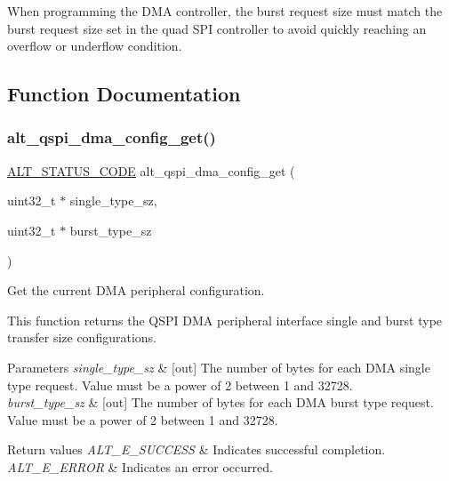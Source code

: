 When programming the D\+MA controller, the burst request size must match the burst request size set in the quad S\+PI controller to avoid quickly reaching an overflow or underflow condition. 

\subsection{Function Documentation}
\mbox{\label{group__ALT__QSPI__DMA_ga92ee264b9fe98d0acfabe3c0ac2d9d1b}} 
\subsubsection{\texorpdfstring{alt\_qspi\_dma\_config\_get()}{alt\_qspi\_dma\_config\_get()}}
{\footnotesize\ttfamily \mbox{\hyperlink{hwlib_8h_abdb0d369f069723ca55d6c94bcaaaa12}{A\+L\+T\+\_\+\+S\+T\+A\+T\+U\+S\+\_\+\+C\+O\+DE}} alt\+\_\+qspi\+\_\+dma\+\_\+config\+\_\+get (\begin{DoxyParamCaption}\item[{uint32\+\_\+t $\ast$}]{single\+\_\+type\+\_\+sz,  }\item[{uint32\+\_\+t $\ast$}]{burst\+\_\+type\+\_\+sz }\end{DoxyParamCaption})}

Get the current D\+MA peripheral configuration.

This function returns the Q\+S\+PI D\+MA peripheral interface single and burst type transfer size configurations.


\begin{DoxyParams}{Parameters}
{\em single\+\_\+type\+\_\+sz} & \mbox{[}out\mbox{]} The number of bytes for each D\+MA single type request. Value must be a power of 2 between 1 and 32728.\\
\hline
{\em burst\+\_\+type\+\_\+sz} & \mbox{[}out\mbox{]} The number of bytes for each D\+MA burst type request. Value must be a power of 2 between 1 and 32728.\\
\hline
\end{DoxyParams}

\begin{DoxyRetVals}{Return values}
{\em A\+L\+T\+\_\+\+E\+\_\+\+S\+U\+C\+C\+E\+SS} & Indicates successful completion. \\
\hline
{\em A\+L\+T\+\_\+\+E\+\_\+\+E\+R\+R\+OR} & Indicates an error occurred. \\
\hline
\end{DoxyRetVals}
\mbox{\label{group__ALT__QSPI__DMA_ga6544a397843d6b1204f500be26896878}} 
